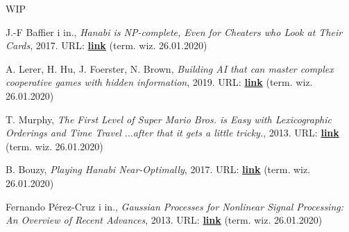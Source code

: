 \documentclass[declaration,shortabstract,inz]{iithesis}
\begin{document}
WIP

\begin{thebibliography}{4}

 J.-F Baffier i in., \textit{Hanabi is NP-complete, Even for Cheaters who Look at Their Cards}, 2017. URL: 
\href{https://arxiv.org/pdf/1603.01911.pdf}{\textbf{link}} (term. wiz. 26.01.2020)

 A. Lerer, H. Hu, J. Foerster, N. Brown, \textit{Building AI that can master complex cooperative games with hidden information}, 2019. URL: 
\href{https://ai.facebook.com/blog/building-ai-that-can-master-complex-cooperative-games-with-hidden-information/}{\textbf{link}} (term. wiz. 26.01.2020)

 T. Murphy, \textit{The First Level of Super Mario Bros. is Easy with Lexicographic Orderings and Time Travel $\ldots$after that it gets a little tricky.}, 2013. URL: 
\href{http://www.cs.cmu.edu/~tom7/mario/mario.pdf}{\textbf{link}} (term. wiz. 26.01.2020)

 B. Bouzy, \textit{Playing Hanabi Near-Optimally}, 2017. URL: 
\href{http://helios.mi.parisdescartes.fr/~bouzy/publications/bouzy-hanabi-2017.pdf}{\textbf{link}} (term. wiz. 26.01.2020)

 Fernando Pérez-Cruz i in., \textit{Gaussian Processes for Nonlinear Signal Processing: An Overview of Recent Advances}, 2013. URL: 
\href{https://www.researchgate.net/publication/260637079_Gaussian_Processes_for_Nonlinear_Signal_Processing_An_Overview_of_Recent_Advances}{\textbf{link}} (term. wiz. 26.01.2020)

\end{thebibliography}
\end{document}
